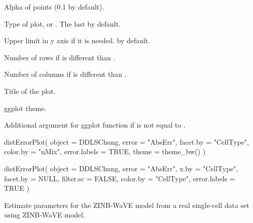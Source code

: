 \documentclass[a4paper]{book}
\begin{document}
\begin{Arguments}
\begin{ldescription}
\item[\code{alpha.point}] Alpha of points (0.1 by default).

\item[\code{type}] Type of plot,  or . The last
by default.

\item[\code{ylimit}] Upper limit in y axis if it is needed.  by default.

\item[\code{nrow}] Number of rows if  is different than .

\item[\code{ncol}] Number of columns if  is different than
.

\item[\code{title}] Title of the plot.

\item[\code{theme}] ggplot theme.

\item[\code{...}] Additional argument for  ggplot function if
 is not equal to .
\end{ldescription}
\end{Arguments}
%
\begin{SeeAlso}\relax
{} 
 
\end{SeeAlso}
%
\begin{Examples}
\begin{ExampleCode}
distErrorPlot(
  object = DDLSChung,
  error = "AbsErr",
  facet.by = "CellType",
  color.by = "nMix",
  error.labels = TRUE,
  theme = theme_bw()
)

distErrorPlot(
  object = DDLSChung,
  error = "AbsErr",
  x.by = "CellType",
  facet.by = NULL,
  filter.sc = FALSE,
  color.by = "CellType",
  error.labels = TRUE
)
\end{ExampleCode}
\end{Examples}
%
\begin{Description}\relax
Estimate parameters for the ZINB-WaVE model from a real single-cell
data set using ZINB-WaVE model.
\end{Description}
\end{document}
